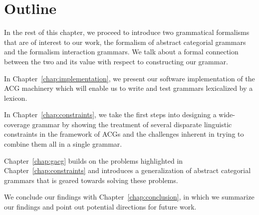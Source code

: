 \section{Outline}

In the rest of this chapter, we proceed to introduce two grammatical
formalisms that are of interest to our work, the formalism of abstract
categorial grammars and the formalism interaction grammars. We talk
about a formal connection between the two and its value with respect to
constructing our grammar.

In Chapter~\ref{chap:implementation}, we present our software
implementation of the ACG machinery which will enable us to write and
test grammars lexicalized by a lexicon.

In Chapter~\ref{chap:constraints}, we take the first steps into
designing a wide-coverage grammar by showing the treatment of several
disparate linguistic constraints in the framework of ACGs and the
challenges inherent in trying to combine them all in a single grammar.

Chapter~\ref{chap:gacg} builds on the problems highlighted in
Chapter~\ref{chap:constraints} and introduces a generalization of
abstract categorial grammars that is geared towards solving these
problems.

We conclude our findings with Chapter~\ref{chap:conclusion}, in which we
summarize our findings and point out potential directions for future
work.
